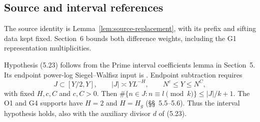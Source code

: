 \subsection{Source and interval references}

The source identity is Lemma~\ref{lem:source-replacement},
with its prefix and sifting data kept fixed.
Section~6 bounds both difference weights,
including the G1 representation multiplicities.

Hypothesis (5.23) follows from the Prime interval coefficients lemma in Section~5.
Its endpoint power-log Siegel--Walfisz input is \cite[(2.21)]{Z1}.
Endpoint subtraction requires
\[
 J\subset[Y/2,Y],\qquad |J|\asymp YL^{-H},\qquad
 N^c\le Y\le N^C,
\]
with fixed $H,c,C$ and $c,C>0$.
Then $\#\{n\in J:n\equiv l\pmod k\}\le|J|/k+1$.
The O1 and G4 supports have $H=2$ and $H=H_g$ (\S\S~5.5--5.6).
Thus the interval hypothesis holds, also with the auxiliary divisor $d$ of (5.23).

